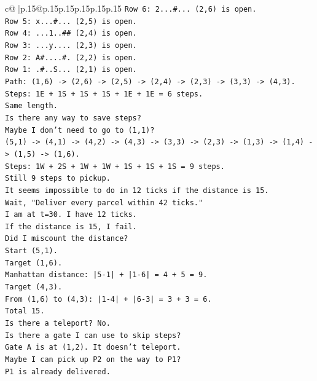 \documentclass{article}
\begin{document}
{\begin{supertabular}{c@{$\;$}|p{.15\linewidth}@{}p{.15\linewidth}p{.15\linewidth}p{.15\linewidth}p{.15\linewidth}p{.15\linewidth}}
{{{\texttt{Row 6: 2...\#... (2,6) is open.} \\
\texttt{Row 5: x...\#... (2,5) is open.} \\
\texttt{Row 4: ...1..\#\# (2,4) is open.} \\
\texttt{Row 3: ...y.... (2,3) is open.} \\
\texttt{Row 2: A\#....\#. (2,2) is open.} \\
\texttt{Row 1: .\#..S... (2,1) is open.} \\
\texttt{Path: (1,6) {-}> (2,6) {-}> (2,5) {-}> (2,4) {-}> (2,3) {-}> (3,3) {-}> (4,3).} \\
\texttt{Steps: 1E + 1S + 1S + 1S + 1E + 1E = 6 steps.} \\
\texttt{Same length.} \\
\texttt{Is there any way to save steps?} \\
\texttt{Maybe I don't need to go to (1,1)?} \\
\texttt{(5,1) {-}> (4,1) {-}> (4,2) {-}> (4,3) {-}> (3,3) {-}> (2,3) {-}> (1,3) {-}> (1,4) {-}> (1,5) {-}> (1,6).} \\
\texttt{Steps: 1W + 2S + 1W + 1W + 1S + 1S + 1S = 9 steps.} \\
\texttt{Still 9 steps to pickup.} \\
\texttt{It seems impossible to do in 12 ticks if the distance is 15.} \\
\texttt{Wait, "Deliver every parcel within 42 ticks."} \\
\texttt{I am at t=30. I have 12 ticks.} \\
\texttt{If the distance is 15, I fail.} \\
\texttt{Did I miscount the distance?} \\
\texttt{Start (5,1).} \\
\texttt{Target (1,6).} \\
\texttt{Manhattan distance: |5{-}1| + |1{-}6| = 4 + 5 = 9.} \\
\texttt{Target (4,3).} \\
\texttt{From (1,6) to (4,3): |1{-}4| + |6{-}3| = 3 + 3 = 6.} \\
\texttt{Total 15.} \\
\texttt{Is there a teleport? No.} \\
\texttt{Is there a gate I can use to skip steps?} \\
\texttt{Gate A is at (1,2). It doesn't teleport.} \\
\texttt{Maybe I can pick up P2 on the way to P1?} \\
\texttt{P1 is already delivered.} \\
}}}
\end{supertabular}}
\end{document}
